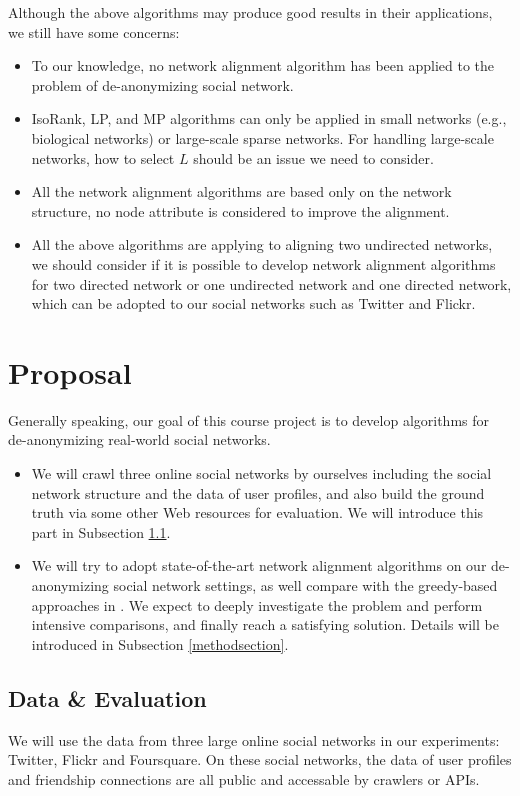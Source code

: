 \documentclass[11pt,letterpaper]{article}
\begin{document}
Although the above algorithms may produce good results in their applications, we still have some concerns:
\begin{itemize}
	\item
		To our knowledge, no network alignment algorithm has been applied to the problem of de-anonymizing social network.
	\item
		IsoRank, LP, and MP algorithms can only be applied in small networks (e.g., biological networks) or large-scale sparse networks. For handling large-scale networks, how to select $L$ should be an issue we need to consider. 
	\item
		All the network alignment algorithms are based only on the network structure, no node attribute is considered to improve the alignment. 
	\item
		All the above algorithms are applying to aligning two undirected networks, we should consider if it is possible to develop network alignment algorithms for two directed network or one undirected network and one directed network, which can be adopted to our social networks such as Twitter and Flickr. 
\end{itemize}


\section{Proposal}

Generally speaking, our goal of this course project is to develop algorithms for de-anonymizing real-world social networks. 
\begin{itemize}
	\item
		We will crawl three online social networks by ourselves including the social network structure and the data of user profiles, and also build the ground truth via some other Web resources for evaluation. We will introduce this part in Subsection \ref{datasection}.
	\item
		We will try to adopt state-of-the-art network alignment algorithms on our de-anonymizing social network settings, as well compare with the greedy-based approaches in \cite{Narayanan2009}. We expect to deeply investigate the problem and perform intensive comparisons, and finally reach a satisfying solution. Details will be introduced in Subsection \ref{methodsection}.
\end{itemize}

\subsection{Data \& Evaluation}
\label{datasection}
We will use the data from three large online social networks in our experiments: Twitter, Flickr and Foursquare. On these social networks, the data of user profiles and friendship connections are all public and accessable by crawlers or APIs. 
\end{document}

